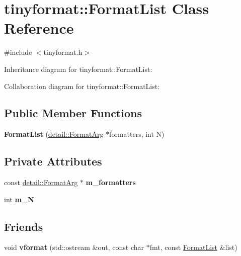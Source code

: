 \hypertarget{classtinyformat_1_1FormatList}{}\section{tinyformat\+:\+:Format\+List Class Reference}
\label{classtinyformat_1_1FormatList}


{\ttfamily \#include $<$tinyformat.\+h$>$}



Inheritance diagram for tinyformat\+:\+:Format\+List\+:


Collaboration diagram for tinyformat\+:\+:Format\+List\+:
\subsection*{Public Member Functions}
\begin{DoxyCompactItemize}
\item 
\mbox{\label{classtinyformat_1_1FormatList_a4dc93948fa7b945665800b5c147037c3}} 
{\bfseries Format\+List} (\mbox{\hyperlink{classtinyformat_1_1detail_1_1FormatArg}{detail\+::\+Format\+Arg}} $\ast$formatters, int N)
\end{DoxyCompactItemize}
\subsection*{Private Attributes}
\begin{DoxyCompactItemize}
\item 
\mbox{\label{classtinyformat_1_1FormatList_a90b0b9b03a90c09e8734b51f8be3f734}} 
const \mbox{\hyperlink{classtinyformat_1_1detail_1_1FormatArg}{detail\+::\+Format\+Arg}} $\ast$ {\bfseries m\+\_\+formatters}
\item 
\mbox{\label{classtinyformat_1_1FormatList_aee4267e50285b7adeb57b61d6305312b}} 
int {\bfseries m\+\_\+N}
\end{DoxyCompactItemize}
\subsection*{Friends}
\begin{DoxyCompactItemize}
\item 
\mbox{\label{classtinyformat_1_1FormatList_a105eb7b498f1353f8da108bd7284af58}} 
void {\bfseries vformat} (std\+::ostream \&out, const char $\ast$fmt, const \mbox{\hyperlink{classtinyformat_1_1FormatList}{Format\+List}} \&list)
\end{DoxyCompactItemize}


